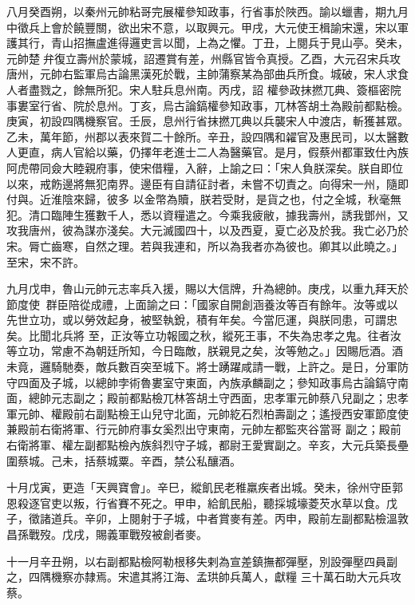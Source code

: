 \begin{pinyinscope}
 八月癸酉朔，以秦州元帥粘哥完展權參知政事，行省事於陜西。諭以蠟書，期九月中徵兵上會於饒豐關，欲出宋不意，以取興元。甲戌，大元使王楫諭宋還，宋以軍護其行，青山招撫盧進得邏吏言以聞，上為之懼。丁丑，上閱兵于見山亭。癸未，元帥楚弁復立壽州於蒙城，詔遷賞有差，州縣官皆令真授。乙酉，大元召宋兵攻唐州，元帥右監軍烏古論黑漢死於戰，主帥蒲察某為部曲兵所食。城破，宋人求食人者盡戮之，餘無所犯。宋人駐兵息州南。丙戌，詔
 權參政抹撚兀典、簽樞密院事婁室行省、院於息州。丁亥，烏古論鎬權參知政事，兀林答胡土為殿前都點檢。庚寅，初設四隅機察官。壬辰，息州行省抹撚兀典以兵襲宋人中渡店，斬獲甚眾。乙未，萬年節，州郡以表來賀二十餘所。辛丑，設四隅和糴官及惠民司，以太醫數人更直，病人官給以藥，仍擇年老進士二人為醫藥官。是月，假蔡州都軍致仕內族阿虎帶同僉大睦親府事，使宋借糧，入辭，上諭之曰：「宋人負朕深矣。朕自即位以來，戒飭邊將無犯南界。邊臣有自請征討者，未嘗不切責之。向得宋一州，隨即付與。近淮陰來歸，彼多
 以金幣為贖，朕若受財，是貨之也，付之全城，秋毫無犯。清口臨陣生獲數千人，悉以資糧遣之。今乘我疲敝，據我壽州，誘我鄧州，又攻我唐州，彼為謀亦淺矣。大元滅國四十，以及西夏，夏亡必及於我。我亡必乃於宋。脣亡齒寒，自然之理。若與我連和，所以為我者亦為彼也。卿其以此曉之。」至宋，宋不許。



 九月戊申，魯山元帥元志率兵入援，賜以大信牌，升為總帥。庚戌，以重九拜天於節度使，群臣陪從成禮，上面諭之曰：「國家自開創涵養汝等百有餘年。汝等或以先世立功，或以勞效起身，被堅執銳，積有年矣。今當厄運，與朕同患，可謂忠矣。比聞北兵將
 至，正汝等立功報國之秋，縱死王事，不失為忠孝之鬼。往者汝等立功，常慮不為朝廷所知，今日臨敵，朕親見之矣，汝等勉之。」因賜卮酒。酒未竟，邏騎馳奏，敵兵數百突至城下。將士踴躍咸請一戰，上許之。是日，分軍防守四面及子城，以總帥孛術魯婁室守東面，內族承麟副之；參知政事烏古論鎬守南面，總帥元志副之；殿前都點檢兀林答胡土守西面，忠孝軍元帥蔡八兒副之；忠孝軍元帥、權殿前右副點檢王山兒守北面，元帥紇石烈柏壽副之；遙授西安軍節度使兼殿前右衛將軍、行元帥府事女奚烈出守東南，元帥左都監夾谷當哥
 副之；殿前右衛將軍、權左副都點檢內族斜烈守子城，都尉王愛實副之。辛亥，大元兵築長壘圍蔡城。己未，括蔡城粟。辛酉，禁公私釀酒。



 十月戊寅，更造「天興寶會」。辛巳，縱飢民老稚羸疾者出城。癸未，徐州守臣郭恩殺逐官吏以叛，行省賽不死之。甲申，給飢民船，聽採城壕菱芡水草以食。戊子，徵諸道兵。辛卯，上閱射于子城，中者賞麥有差。丙申，殿前左副都點檢溫敦昌孫戰歿。戊戌，賜義軍戰歿被創者麥。



 十一月辛丑朔，以右副都點檢阿勒根移失剌為宣差鎮撫都彈壓，別設彈壓四員副之，四隅機察亦隸焉。宋遣其將江海、孟珙帥兵萬人，獻糧
 三十萬石助大元兵攻蔡。




\end{pinyinscope}
